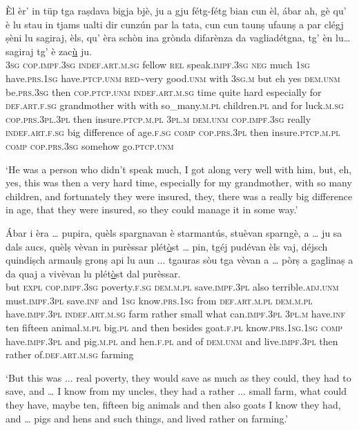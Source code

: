 \begin{linenumbers}
\gll  Èl èr’ in tüp tga raṣdava bigja bjè, ju a gju fétg-fétg bian cun èl, ábar ah, gè qu’ è lu stau in tjams ualti dir cunzún par la tata, cun cun taunṣ ufaunṣ a par clégj ṣèni lu sagiraj, èls, qu’ èra schòn ina grònda difarènza da vagliadétgna, tg' èn lu… sagiraj tg' è zac\underline{ù} ju. \\
  \textsc{3sg} \textsc{cop.impf.3sg} \textsc{indef.art.m.sg} fellow \textsc{rel} speak.\textsc{impf.3sg} \textsc{neg} much \textsc{1sg} have.\textsc{prs.1sg} have.\textsc{ptcp.unm} \textsc{red}\textasciitilde{very} good.\textsc{unm} with \textsc{3sg.m} but eh yes \textsc{dem.unm} be.\textsc{prs.3sg} then \textsc{cop.ptcp.unm} \textsc{indef.art.m.sg} time quite hard especially for \textsc{def.art.f.sg} grandmother with with so\_many.\textsc{m.pl} children.\textsc{pl} and for luck.\textsc{m.sg} \textsc{cop.prs.3pl.3pl}  then insure.\textsc{ptcp.m.pl} \textsc{3pl.m} \textsc{dem.unm} \textsc{cop.impf.3sg} really \textsc{indef.art.f.sg} big difference of age.\textsc{f.sg} \textsc{comp} \textsc{cop.prs.3pl} then insure.\textsc{ptcp.m.pl} \textsc{comp} \textsc{cop.prs.3sg} somehow go.\textsc{ptcp.unm}\\
\end{linenumbers}
\medskip
\glt `He was a person who didn’t speak much, I got along very well with him, but, eh, yes, this was then a very hard time, especially for my grandmother, with so many children, and fortunately they were insured, they, there was a really big difference in age, that they were insured, so they could manage it in some way.'
\medskip

\begin{linenumbers}
\gll   Ábar i èra … pupira, quèls spargnavan è starmantús, stuèvan sparngè, a … ju sa dals aucs, quèlṣ vèvan in purèssar plét\underline{ò}st … pin, tgéj pudévan èls vaj, déjsch quindiṣch armaulṣ gronṣ api lu aun ... tgauras sòu tga vèvan a … pòrṣ a gaglinaṣ a da quaj a vivèvan lu plét\underline{ò}st dal purèssar. \\
 but \textsc{expl} \textsc{cop.impf.3sg} {} poverty.\textsc{f.sg} \textsc{dem.m.pl} save.\textsc{impf.3pl} also terrible.\textsc{adj.unm} must.\textsc{impf.3pl} save.\textsc{inf} and  {} \textsc{1sg} know.\textsc{prs.1sg} from \textsc{def.art.m.pl} \textsc{dem.m.pl} have.\textsc{impf.3pl} \textsc{indef.art.m.sg} farm rather {} small what can.\textsc{impf.3pl} \textsc{3pl.m} have.\textsc{inf} ten fifteen animal.\textsc{m.pl} big.\textsc{pl} and then besides {} goat.\textsc{f.pl} know.\textsc{prs.1sg.1sg} \textsc{comp} have.\textsc{impf.3pl} and {} pig.\textsc{m.pl} and hen.\textsc{f.pl} and of \textsc{dem.unm} and live.\textsc{impf.3pl} then rather of.\textsc{def.art.m.sg} farming\\
\end{linenumbers}
\medskip
\glt `But this was ... real poverty, they would save as much as they  could, they had to save, and … I know from my uncles, they had a rather ... small farm, what could they have, maybe ten, fifteen big animals and then also goats I know they had, and … pigs and hens and such things, and lived rather on farming.'
\medskip

